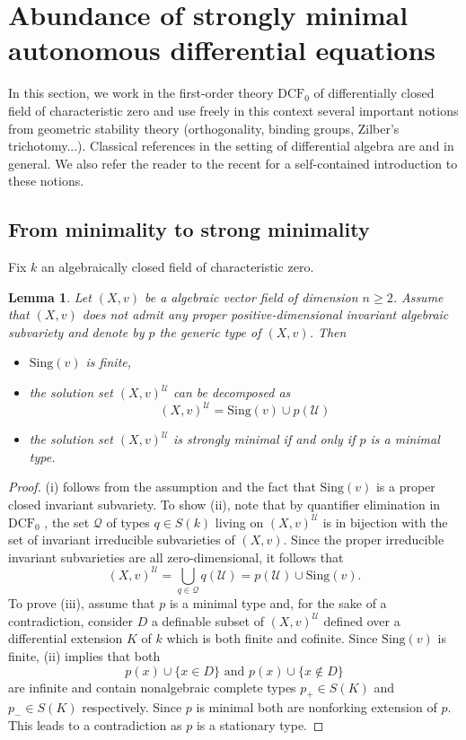 \documentclass[12pt]{amsart}
\newcommand{\U}{\mathcal{U}}
\theoremstyle{definition}
\theoremstyle{plain}
\newtheorem{lemma}[definition]{Lemma}
\theoremstyle{exampstyle}
\theoremstyle{exampstyle}\newtheorem{thmxbis}{Theorem}
\numberwithin{equation}{section}
\theoremstyle{remark}
\begin{document}
\section{Abundance of strongly minimal autonomous differential equations}

In this section, we work in the first-order theory $\mathrm{DCF}_0$ of differentially closed field of characteristic zero and use freely in this context several important notions from geometric stability theory (orthogonality, binding groups, Zilber's trichotomy...). Classical references in the setting of differential algebra are \cite{Bouscaren, Marker}  and \cite{Pillay} in general. We also refer the reader to the recent \cite{Pizarro} for a self-contained introduction to these notions.


\subsection{From minimality to strong minimality} Fix $k$ an algebraically closed field of characteristic zero.


\begin{lemma} \label{lemma-strongminimality}
Let $(X,v)$ be a algebraic vector field of dimension $n \geq 2$. Assume that $(X,v)$ does not admit any proper positive-dimensional invariant algebraic subvariety
and denote by $p$ the generic type of $(X,v)$. Then 
\begin{itemize} 
\item[(i)] $\mathrm{Sing}(v)$ is finite, 
\item[(ii)] the solution set $(X,v)^\U$ can be decomposed as 
$$ (X,v)^\U = \mathrm{Sing}(v) \cup p(\U) $$
\item[(iii)] the solution set $(X,v)^\U$ is strongly minimal if and only if $p$ is a minimal type.
\end{itemize} 
\end{lemma} 

\begin{proof} 
(i) follows from the assumption and the fact that $\mathrm{Sing}(v)$ is a proper closed invariant subvariety.  To show (ii), note that by quantifier elimination in $\mathrm{DCF}_0$ \cite[Theorem 1.1]{Marker}, the set $\mathcal Q$  of types $q \in S(k)$ living on $(X,v)^\U$ is in bijection with the set of invariant irreducible subvarieties of $(X,v)$. Since the proper irreducible invariant subvarieties are all zero-dimensional, it follows that  
$$(X,v)^\U = \bigcup_{q \in \mathcal Q} q(\U) = p(\U) \cup \mathrm{Sing}(v).$$
To prove (iii), assume that $p$ is a minimal type and, for the sake of a contradiction, consider $D$ a definable subset of $(X,v)^\U$ defined over a differential extension $K$ of $k$ which is both finite and cofinite.  Since $\mathrm{Sing}(v)$ is finite, (ii) implies that both 
$$p(x) \cup \lbrace x \in D \rbrace \text{ and } p(x) \cup \lbrace x \notin D \rbrace $$ 
are infinite and contain nonalgebraic complete types $p_+ \in S(K)$ and $p_-\in S(K)$ respectively. Since $p$ is minimal both are nonforking extension of $p$. This leads to a contradiction as $p$ is a stationary type.  
\end{proof} 
\end{document}
